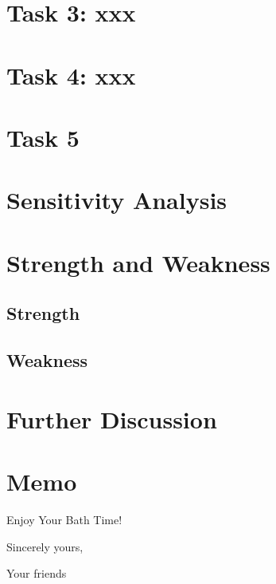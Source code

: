 \documentclass{mcmthesis}
\begin{document}
	
	
	
	
	
	
	
	

	
	\section{Task 3: xxx}
	
	
	\section{Task 4: xxx}
	
	\section{Task 5}
	
	\section{Sensitivity Analysis}
	
	\section{Strength and Weakness}
	\subsection{Strength}
	\subsection{Weakness}
	
	\section{Further Discussion}
	
	
	
	\newpage
	\section*{Memo} %
	
	\begin{letter}{Enjoy Your Bath Time!}
		
		
		\vspace{\parskip}
		
		Sincerely yours,
		
		Your friends
		
	\end{letter}
	
\end{document}
